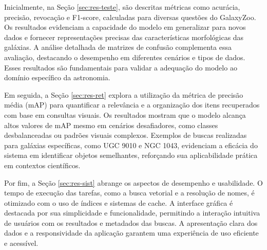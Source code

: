 Inicialmente, na Seção \ref{sec:res-teste}, são descritas métricas como acurácia, precisão, revocação e F1-score, calculadas para diversas questões do GalaxyZoo. Os resultados evidenciam a capacidade do modelo em generalizar para novos dados e fornecer representações precisas das características morfológicas das galáxias. A análise detalhada de matrizes de confusão complementa essa avaliação, destacando o desempenho em diferentes cenários e tipos de dados. Esses resultados são fundamentais para validar a adequação do modelo ao domínio específico da astronomia.

Em seguida, a Seção \ref{sec:res-ret} explora a utilização da métrica de precisão média (mAP) para quantificar a relevância e a organização dos itens recuperados com base em consultas visuais. Os resultados mostram que o modelo alcança altos valores de mAP mesmo em cenários desafiadores, como classes desbalanceadas ou padrões visuais complexos. Exemplos de buscas realizadas para galáxias específicas, como UGC 9010 e NGC 1043, evidenciam a eficácia do sistema em identificar objetos semelhantes, reforçando sua aplicabilidade prática em contextos científicos.

Por fim, a Seção \ref{sec:res-sist} abrange os aspectos de desempenho e usabilidade. O tempo de execução das tarefas, como a busca vetorial e a resolução de nomes, é otimizado com o uso de índices e sistemas de cache. A interface gráfica é destacada por sua simplicidade e funcionalidade, permitindo a interação intuitiva de usuários com os resultados e metadados das buscas. A apresentação clara dos dados e a responsividade da aplicação garantem uma experiência de uso eficiente e acessível.



\chaptersep
